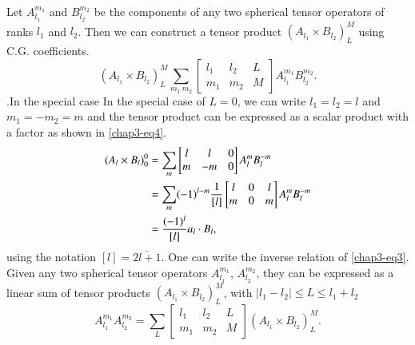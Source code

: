 Let $A_{l_1}^{m_1}$ and $B_{l_2}^{m_2}$ be the components of any two spherical tensor operators of ranks $l_1$ and $l_2$. Then we can construct a tensor product $(A_{l_1} \times B_{l_2})^M_L$ using C.G. coefficients.
\begin{equation}
(A_{l_1} \times B_{l_2})^M_L \sum_{m_1 ~m_2} 
\begin{bmatrix}
  l_1 & l_2 & L\\
  m_1 & m_2 & M
\end{bmatrix}
A_{l_1}^{m_1} B_{l_2}^{m_2}.  \label{chap3-eq3}
\end{equation}
.In the special case In the special case of $L = 0$, we can write $l_1 = l_2 = l$ and $m_1 = -m_2 = m$ and the
tensor product can be expressed as a scalar product with a factor as shown in \eqref{chap3-eq4}.
\begin{align}
  (A_l \times B_l)^0_0 & = \sum_{m}
  \begin{bmatrix}  l & l & 0\\    m & -m & 0  \end{bmatrix}  A_l^m B_l^{-m}\notag\\
  & = \sum_m (-1)^{l-m} \frac{1}{[l]}
  \begin{bmatrix}    l & 0 & l\\    m & 0 & m  \end{bmatrix}  A_l^m B_l^{-m}\notag\\
  & = \frac{(-1)^l}{[l]} a_l \cdot B_l, \label{chap3-eq4}
\end{align}
using the notation $[l] = \bar{2l + 1}$. One can write the inverse relation of \eqref{chap3-eq3}. Given any two spherical tensor operators $A_{l_1}^{m_1}$, $A_{l_2}^{m_2}$, they can be expressed as a linear sum of tensor products $(A_{l_1} \times B_{l_2})^M_L$, with $|l_1 -  l_2 | \leq L \leq l_1 + l_2$ 
\begin{equation}
A_{l_1}^{m_1} A_{l_2}^{m_2} = \sum_{L} 
\begin{bmatrix}
l_1 & l_2 &L\\
m_1 & m_2 & M
\end{bmatrix} (A_{l_1} \times B_{l_2})^M_L. \label{chap3-eq5}
\end{equation}

